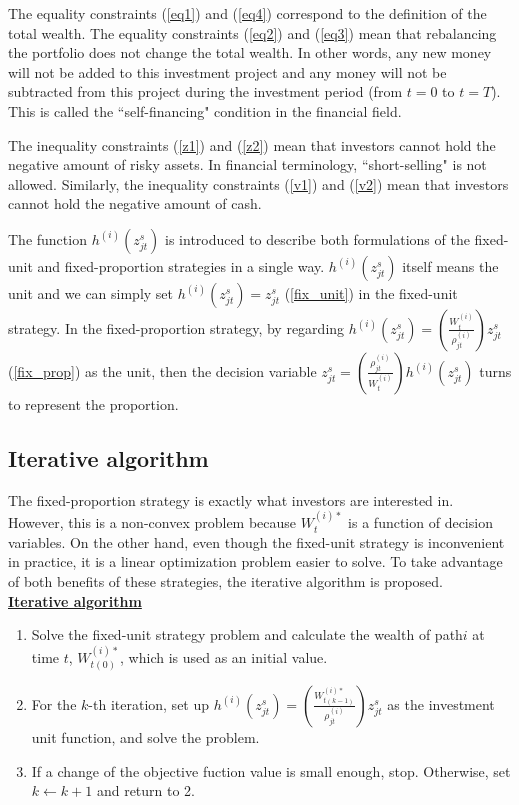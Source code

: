 \documentclass[11t]{article}
\begin{document}
The equality constraints (\ref{eq1}) and (\ref{eq4}) correspond to the definition of the total wealth. The equality constraints (\ref{eq2}) and (\ref{eq3}) mean that rebalancing the portfolio does not change the total wealth. In other words, any new money will not be added to this investment project and any money will not be subtracted from this project during the investment period (from $t=0$ to $t=T$). This is called the ``self-financing" condition in the financial field.

The inequality constraints (\ref{z1}) and (\ref{z2}) mean that investors cannot hold the negative amount of risky assets. In financial terminology, ``short-selling" is not allowed. Similarly, the inequality constraints (\ref{v1}) and (\ref{v2}) mean that investors cannot hold the negative amount of cash.

The function $h^{(i)} ( z^{s}_{jt} )$ is introduced to describe both formulations of the fixed-unit and fixed-proportion strategies in a single way. 
 $h^{(i)} ( z^{s}_{jt} )$ itself means the unit and we can simply set  $h^{(i)} ( z^{s}_{jt} ) =  z^{s}_{jt} $ (\ref{fix_unit}) in the fixed-unit strategy.
In the fixed-proportion strategy, by regarding  $h^{(i)} ( z^{s}_{jt} ) = \left( \frac{ W_t^{(i)}}{ \rho_{jt}^{(i)} } \right) z^{s}_{jt}$  (\ref{fix_prop}) as the unit, 
then the decision variable $z^{s}_{jt} =  \left( \frac{ \rho_{jt}^{(i)} }{ W_t^{(i)}} \right)  h^{(i)} ( z^{s}_{jt} )$ turns to represent the proportion.

\subsection{Iterative algorithm}
The fixed-proportion strategy is exactly what investors are interested in. However, this is a non-convex problem because $W^{(i)*}_t$ is a function of decision variables. On the other hand, even though the fixed-unit strategy is inconvenient in practice, it is a linear optimization problem easier to solve. 
To take advantage of both benefits of these strategies, the iterative algorithm is proposed. \vspace{3mm} \\

{\bf \underline{Iterative algorithm}}
\begin{enumerate}
\item Solve the fixed-unit strategy problem and calculate the wealth of path$i$ at time $t$, $W_{t(0)}^{{(i)*}}$, which is used as an initial value.
\item For the $k$-th iteration, set up $ h^{(i)} ( z^{s}_{jt} ) = \left( \frac{ W_{t(k-1)}^{(i)*}}{ \rho_{jt}^{(i)} } \right) z^{s}_{jt} $ as the investment unit function, and solve the problem.
\item If a change of the objective fuction value is small enough, stop. Otherwise, set $k \leftarrow k + 1$ and return to 2. 
\end{enumerate}
\end{document}
